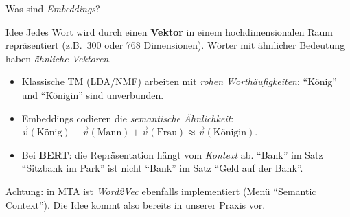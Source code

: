\documentclass[aspectratio=169,11pt]{beamer}
\let\oldemph\emph
\renewcommand{\emph}[1]{{\color{solCyan}\oldemph{#1}}}
\let\oldtextbf\textbf
\renewcommand{\textbf}[1]{{\color{solBase3}\oldtextbf{#1}}}
\begin{document}
\begin{frame}{Was sind \emph{Embeddings}?}

  \begin{block}{Idee}
    Jedes Wort wird durch einen \textbf{Vektor} in einem hochdimensionalen
    Raum repräsentiert (z.B.\ 300 oder 768 Dimensionen).
    Wörter mit ähnlicher Bedeutung haben \emph{ähnliche Vektoren}.
  \end{block}

  \vfill
  \begin{itemize}
    \item Klassische TM (LDA/NMF) arbeiten mit \emph{rohen Worthäufigkeiten}:
          \enquote{König} und \enquote{Königin} sind unverbunden.
    \vfill
    \item Embeddings codieren die \emph{semantische Ähnlichkeit}:
          $\vec{v}(\text{König}) - \vec{v}(\text{Mann}) + \vec{v}(\text{Frau})
          \approx \vec{v}(\text{Königin})$.
    \vfill
    \item Bei \textbf{BERT}: die Repräsentation hängt vom \emph{Kontext} ab.
          \enquote{Bank} im Satz \enquote{Sitzbank im Park} ist nicht
          \enquote{Bank} im Satz \enquote{Geld auf der Bank}.
  \end{itemize}

  \vfill
  \footnotesize\color{black!60}
  Achtung: in MTA ist \emph{Word2Vec} ebenfalls implementiert (Menü
  \enquote{Semantic Context}). Die Idee kommt also bereits in unserer
  Praxis vor.

\end{frame}
\end{document}
